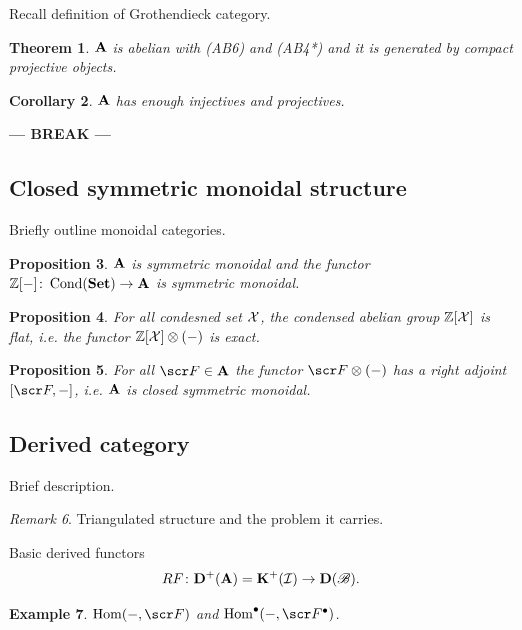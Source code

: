 \documentclass[A4paper, british]{amsart}
\theoremstyle{darkgreentheorem}
\newtheorem{thm}{Theorem}[section]
\newtheorem{prop}[thm]{Proposition}
\newtheorem{cor}[thm]{Corollary}
\theoremstyle{darkbluedefinition}
\theoremstyle{darkredexample}
\newtheorem{exa}[thm]{Example}
\theoremstyle{remark}
\newtheorem{rem}[thm]{Remark}
\DeclareMathOperator{\Hom}{Hom}
\DeclareMathOperator{\Cond}{Cond}
\newcommand{\1}{\mathbbm{1}}
\newcommand{\ot}{\otimes}
\newcommand{\grd}{^{\bullet}}
\begin{document}
Recall definition of Grothendieck category.

\begin{thm}
    $\mathbf{A}$ is abelian with (AB6) and (AB4*) and it is generated by compact projective objects.
\end{thm}

\begin{cor}
    $\mathbf{A}$ has enough injectives and projectives.
\end{cor}

\begin{center}
    \textbf{--- BREAK ---}
\end{center}

\subsection{Closed symmetric monoidal structure}

Briefly outline monoidal categories.

\begin{prop}
    $\mathbf{A}$ is symmetric monoidal and the functor $\Z[-]\colon \Cond(\Set)\to \bfA$ is symmetric monoidal.
\end{prop}

\begin{prop}
    For all condesned set $\mathcal{X}$, the condensed abelian group $\mathbb{Z}[\mathcal{X}]$ is flat, i.e. the functor $\Z[\X]\ot (-)$ is exact.
\end{prop}

\begin{prop}
    For all $\F\in\bfA$ the functor $\F\ot(-)$ has a right adjoint $[\F,-]$, i.e. $\mathbf{A}$ is closed symmetric monoidal.
\end{prop}

\subsection{Derived category}

Brief description.

\begin{rem}
    Triangulated structure and the problem it carries.
\end{rem}

Basic derived functors
\[ RF\colon \mathbf{D}^{+}(\mathbf{A})=\mathbf{K}^{+}(\mathcal{I})\to \mathbf{D}(\mathscr{B}). \]

\begin{exa}
    $\Hom(-,\F)$ and $\Hom\grd(-,\F\grd)$.
\end{exa}
\end{document}
